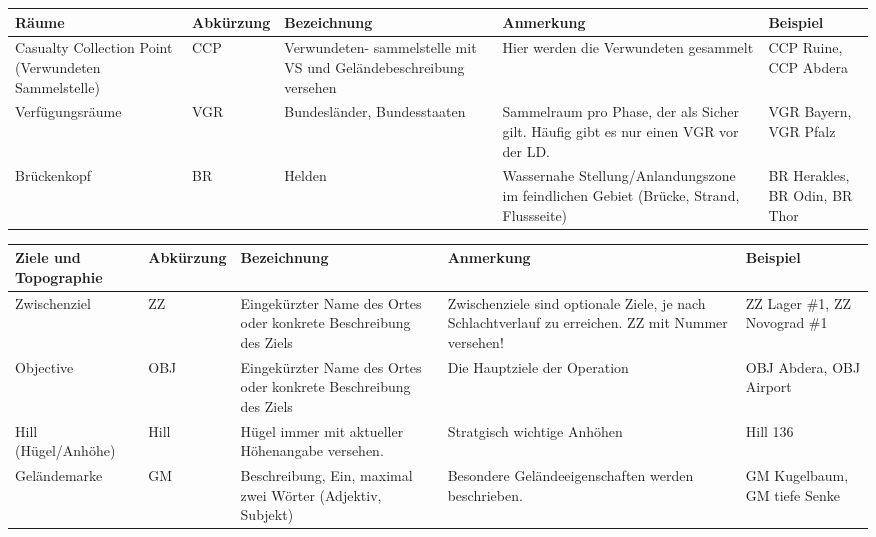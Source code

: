\begin{longtable}{|p{3cm}|p{}|p{}|p{4cm}|p{}|} 																											\hline
	Räume			&		Abkürzung			&		Bezeichnung				&			Anmerkung 									&		Beispiel 			\\ \hline
	Casualty Collection Point (Verwundeten Sammelstelle) & CCP	& 		Verwundeten- sammelstelle mit VS und Geländebeschreibung versehen & Hier werden die Verwundeten gesammelt		& 		CCP Ruine, CCP Abdera	\\ \hline
	Verfügungsräume		&		VGR				&		Bundesländer, Bundesstaaten	&			Sammelraum pro Phase, der als Sicher gilt. Häufig gibt es nur einen VGR vor der LD. 	&	VGR Bayern, VGR Pfalz \\ \hline
	Brückenkopf			&		BR				&		Helden				&			Wassernahe Stellung/Anlandungszone  im feindlichen Gebiet (Brücke, Strand, Flussseite)	& BR Herakles, BR Odin, BR Thor \\ \hline
\end{longtable}

\begin{longtable}{|p{3cm}|p{}|p{}|p{4cm}|p{}|} 																											\hline
	Ziele und Topographie	&		Abkürzung			&		Bezeichnung				&			Anmerkung 									&		Beispiel 			\\ \hline
	Zwischenziel			&		ZZ				&		Eingekürzter Name des Ortes oder konkrete Beschreibung des Ziels	&	Zwischenziele sind optionale Ziele, je nach Schlachtverlauf zu erreichen. ZZ mit Nummer versehen!	& ZZ Lager \#1, ZZ Novograd \#1 \\ \hline
	Objective			&		OBJ				&		Eingekürzter Name des Ortes oder konkrete Beschreibung des Ziels	&	Die Hauptziele der Operation		&		OBJ Abdera, OBJ Airport	\\ \hline
	Hill (Hügel/Anhöhe)		&		Hill				&		Hügel immer mit aktueller Höhenangabe versehen.	&	Stratgisch wichtige Anhöhen					&		Hill 136			\\ \hline
	Geländemarke		&		GM				&		Beschreibung, Ein, maximal zwei Wörter (Adjektiv, Subjekt)	&	Besondere Geländeeigenschaften werden beschrieben.	& 	GM Kugelbaum, GM tiefe Senke \\ \hline
\end{longtable}